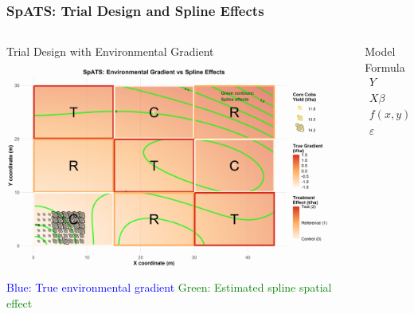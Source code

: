 \begin{frame}
    \frametitle{SpATS: Trial Design and Spline Effects}
    \begin{columns}[T]
        \begin{column}{0.55\textwidth}
            \begin{block}{Trial Design with Environmental Gradient}
                \centering
                \includegraphics[width=0.95\textwidth]{Imgs/spats_trial_design_spline.png}
                \vspace{0.5em}
                \scriptsize
                \textcolor{blue}{Blue: True environmental gradient}
                \textcolor{green}{Green: Estimated spline spatial effect}
            \end{block}
        \end{column}
        \begin{column}{0.45\textwidth}
            \begin{block}{Model Formula}
                \vspace{0.5em}
                \begin{align*}
                    Y &= X\beta + f(x, y) + \varepsilon \\
                    X\beta &: \text{Treatment effect} \\
                    f(x, y) &: \text{Smooth spatial surface} \\
                    \varepsilon &: \text{Random error}
                \end{align*}
            \end{block}
        \end{column}
    \end{columns}
\end{frame}

